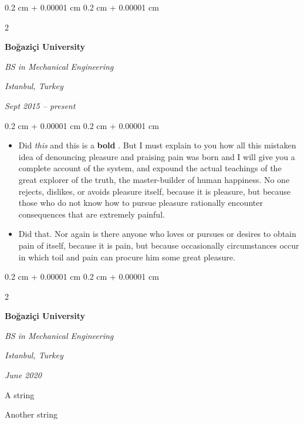 \documentclass[10pt, letterpaper]{article}
\newenvironment{summary}{
    \begin{description}[
        topsep=0.10 cm,
        parsep=0.10 cm,
        partopsep=0pt,
        itemsep=0pt,
        leftmargin=0.4 cm + 10pt
    ]
}{
    \end{description}
} %
\newenvironment{highlights}{
    \begin{itemize}[
        topsep=0.10 cm,
        parsep=0.10 cm,
        partopsep=0pt,
        itemsep=0pt,
        leftmargin=0.4 cm + 10pt
    ]
}{
    \end{itemize}
} %
\newenvironment{onecolentry}{
    \begin{adjustwidth}{
        0.2 cm + 0.00001 cm
    }{
        0.2 cm + 0.00001 cm
    }
}{
    \end{adjustwidth}
} %
\newenvironment{twocolentry}[2][]{
    \onecolentry
    \def\secondColumn{#2}
    \setcolumnwidth{\fill, 4.5 cm}
    \begin{paracol}{2}
}{
    \switchcolumn \raggedleft \secondColumn
    \end{paracol}
    \endonecolentry
} %
\let\hrefWithoutArrow\href
\renewcommand{\href}[2]{\hrefWithoutArrow{#1}{\ifthenelse{\equal{#2}{}}{ }{#2 }\raisebox{.15ex}{\footnotesize \faExternalLink*}}}
\begin{document}
        \vspace{0.2 cm}

        \begin{twocolentry}{
        \textit{Istanbul, Turkey}    
            
        \textit{Sept 2015 – present}}
            \textbf{Boğaziçi University}

            \textit{BS in Mechanical Engineering}
        \end{twocolentry}
        \vspace{0.10 cm}
        \begin{onecolentry}
            \begin{highlights}
                \item Did \textit{this} and this is a \textbf{bold} \href{https://example.com}{link}. But I must explain to you how all this mistaken idea of denouncing pleasure and praising pain was born and I will give you a complete account of the system, and expound the actual teachings of the great explorer of the truth, the master-builder of human happiness. No one rejects, dislikes, or avoids pleasure itself, because it is pleasure, but because those who do not know how to pursue pleasure rationally encounter consequences that are extremely painful.
                \item Did that. Nor again is there anyone who loves or pursues or desires to obtain pain of itself, because it is pain, but because occasionally circumstances occur in which toil and pain can procure him some great pleasure.
            \end{highlights}
        \end{onecolentry}


        \vspace{0.2 cm}

        \begin{twocolentry}{
        \textit{Istanbul, Turkey}    
            
        \textit{June 2020}}
            \textbf{Boğaziçi University}

            \textit{BS in Mechanical Engineering}
        \end{twocolentry}
            \begin{summary}
                \item A string
                \item Another string
            \end{summary}


        \vspace{0.2 cm}
\end{document}
